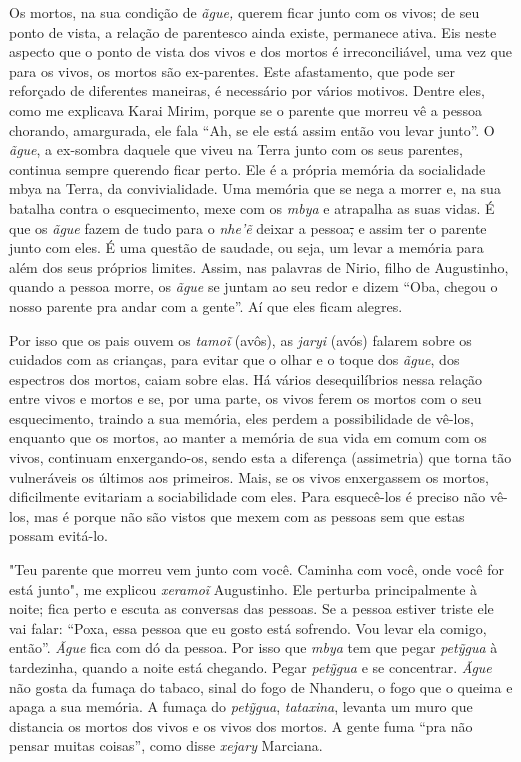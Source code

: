 Os mortos, na sua condição de \emph{ãgue,} querem ficar junto com os
vivos; de seu ponto de vista, a relação de parentesco ainda existe,
permanece ativa. Eis neste aspecto que o ponto de vista dos vivos e dos
mortos é irreconciliável, uma vez que para os vivos, os mortos são
ex-parentes. Este afastamento, que pode ser reforçado de diferentes
maneiras, é necessário por vários motivos. Dentre eles, como me
explicava Karai Mirim, porque se o parente que morreu vê a pessoa
chorando, amargurada, ele fala ``Ah, se ele está assim então vou levar
junto''. O \emph{ãgue}, a ex-sombra daquele que viveu na Terra junto com
os seus parentes, continua sempre querendo ficar perto. Ele é a própria
memória da socialidade mbya na Terra, da convivialidade. Uma memória que
se nega a morrer e, na sua batalha contra o esquecimento, mexe com os
\emph{mbya} e atrapalha as suas vidas. É que os \emph{ãgue} fazem de
tudo para o \emph{nhe'ẽ} deixar a pessoa\sout{,} e assim ter o parente
junto com eles. É uma questão de saudade, ou seja, um levar a memória
para além dos seus próprios limites. Assim, nas palavras de Nirio, filho
de Augustinho, quando a pessoa morre, os \emph{ãgue} se juntam ao seu
redor e dizem ``Oba, chegou o nosso parente pra andar com a gente''. Aí
que eles ficam alegres.

Por isso que os pais ouvem os \emph{tamoĩ} (avôs), as \emph{jaryi}
(avós) falarem sobre os cuidados com as crianças, para evitar que o
olhar e o toque dos \emph{ãgue}, dos espectros dos mortos, caiam sobre
elas. Há vários desequilíbrios nessa relação entre vivos e mortos e se,
por uma parte, os vivos ferem os mortos com o seu esquecimento, traindo
a sua memória, eles perdem a possibilidade de vê-los, enquanto que os
mortos, ao manter a memória de sua vida em comum com os vivos, continuam
enxergando-os, sendo esta a diferença (assimetria) que torna tão
vulneráveis os últimos aos primeiros. Mais, se os vivos enxergassem os
mortos, dificilmente evitariam a sociabilidade com eles. Para
esquecê-los é preciso não vê-los, mas é porque não são vistos que mexem
com as pessoas sem que estas possam evitá-lo.

"Teu parente que morreu vem junto com você. Caminha com você, onde você
for está junto", me explicou \emph{xeramoĩ} Augustinho. Ele perturba
principalmente à noite; fica perto e escuta as conversas das pessoas. Se
a pessoa estiver triste ele vai falar: ``Poxa, essa pessoa que eu gosto
está sofrendo. Vou levar ela comigo, então''. \emph{Ãgue} fica com dó da
pessoa. Por isso que \emph{mbya} tem que pegar \emph{petỹgua} à
tardezinha, quando a noite está chegando. Pegar \emph{petỹgua} e se
concentrar. \emph{Ãgue} não gosta da fumaça do tabaco, sinal do fogo de
Nhanderu, o fogo que o queima e apaga a sua memória. A fumaça do
\emph{petỹgua}, \emph{tataxina}, levanta um muro que distancia os mortos
dos vivos e os vivos dos mortos. A gente fuma ``pra não pensar muitas
coisas'', como disse \emph{xejary} Marciana.

